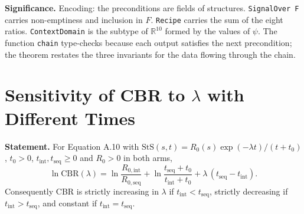 \documentclass[11pt,a4paper]{article}
\begin{document}
	\noindent\textbf{Significance.} Encoding: the preconditions are fields of structures. \texttt{SignalOver F} carries non-emptiness and inclusion in $F$. \texttt{Recipe} carries the sum of the eight ratios. \texttt{ContextDomain} is the subtype of $\mathbb{R}^{10}$ formed by the values of $\psi$. The function \texttt{chain} type-checks because each output satisfies the next precondition; the theorem restates the three invariants for the data flowing through the chain.

	\section{Sensitivity of CBR to $\lambda$ with Different Times}

	\textbf{Statement.} For Equation A.10 with $\text{StS}(s,t)=R_0(s)\exp(-\lambda t)/(t+t_0)$, $t_0>0$, $t_{\text{int}},t_{\text{seq}}\ge0$ and $R_0>0$ in both arms,
\begin{equation}
\ln\text{CBR}(\lambda)=\ln\frac{R_{0,\text{int}}}{R_{0,\text{seq}}}+\ln\frac{t_{\text{seq}}+t_0}{t_{\text{int}}+t_0}+\lambda\,(t_{\text{seq}}-t_{\text{int}}).
\end{equation}
Consequently CBR is strictly increasing in $\lambda$ if $t_{\text{int}}<t_{\text{seq}}$, strictly decreasing if $t_{\text{int}}>t_{\text{seq}}$, and constant if $t_{\text{int}}=t_{\text{seq}}$.
\end{document}
